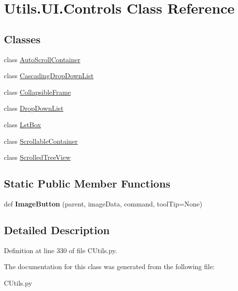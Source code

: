 \hypertarget{class_c_utils_1_1_utils_1_1_u_i_1_1_controls}{}\section{Utils.\+U\+I.\+Controls Class Reference}
\label{class_c_utils_1_1_utils_1_1_u_i_1_1_controls}
\subsection*{Classes}
\begin{DoxyCompactItemize}
\item 
class \hyperlink{class_c_utils_1_1_utils_1_1_u_i_1_1_controls_1_1_auto_scroll_container}{Auto\+Scroll\+Container}
\item 
class \hyperlink{class_c_utils_1_1_utils_1_1_u_i_1_1_controls_1_1_cascading_drop_down_list}{Cascading\+Drop\+Down\+List}
\item 
class \hyperlink{class_c_utils_1_1_utils_1_1_u_i_1_1_controls_1_1_collapsible_frame}{Collapsible\+Frame}
\item 
class \hyperlink{class_c_utils_1_1_utils_1_1_u_i_1_1_controls_1_1_drop_down_list}{Drop\+Down\+List}
\item 
class \hyperlink{class_c_utils_1_1_utils_1_1_u_i_1_1_controls_1_1_lst_box}{Lst\+Box}
\item 
class \hyperlink{class_c_utils_1_1_utils_1_1_u_i_1_1_controls_1_1_scrollable_container}{Scrollable\+Container}
\item 
class \hyperlink{class_c_utils_1_1_utils_1_1_u_i_1_1_controls_1_1_scrolled_tree_view}{Scrolled\+Tree\+View}
\end{DoxyCompactItemize}
\subsection*{Static Public Member Functions}
\begin{DoxyCompactItemize}
\item 
\mbox{\label{class_c_utils_1_1_utils_1_1_u_i_1_1_controls_afafd63786286cd84255ebd2392f6407a}} 
def {\bfseries Image\+Button} (parent, image\+Data, command, tool\+Tip=None)
\end{DoxyCompactItemize}


\subsection{Detailed Description}


Definition at line 330 of file C\+Utils.\+py.



The documentation for this class was generated from the following file\+:\begin{DoxyCompactItemize}
\item 
C\+Utils.\+py\end{DoxyCompactItemize}
